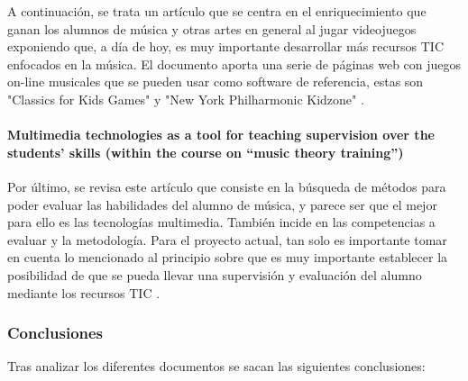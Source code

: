 A continuación, se trata un artículo que se centra en el enriquecimiento que ganan los alumnos de música y otras artes en general al jugar videojuegos exponiendo que, a día de hoy, es muy importante desarrollar más recursos TIC enfocados en la música. El documento aporta una serie de páginas web con juegos on-line musicales que se pueden usar como software de referencia, estas son "Classics for Kids Games" y "New York Philharmonic Kidzone" \cite{Maric2015}.

\newpage

\paragraph{Multimedia technologies as a tool for teaching supervision over the students' skills (within the course on ``music theory training'')}

Por último, se revisa este artículo que consiste en la búsqueda de métodos para poder evaluar las habilidades del alumno de música, y parece ser que el mejor para ello es las tecnologías multimedia. También incide en las competencias a evaluar y la metodología. Para el proyecto actual, tan solo es importante tomar en cuenta lo mencionado al principio sobre que es muy importante establecer la posibilidad de que se pueda llevar una supervisión y evaluación del alumno mediante los recursos TIC \cite{LifeSciJournal2014}.

\subsubsection{Conclusiones}

Tras analizar los diferentes documentos se sacan las siguientes conclusiones:

